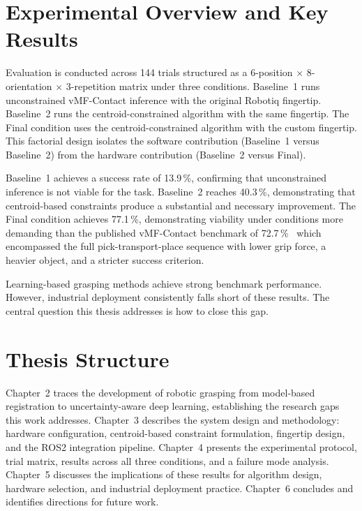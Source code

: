 \documentclass[12pt, a4paper]{report}
\begin{document}
\section{Experimental Overview and Key Results}
\label{sec:experimental-overview}

Evaluation is conducted across 144 trials structured as a 6-position $\times$ 8-orientation $\times$ 3-repetition matrix under three conditions. Baseline~1 runs unconstrained vMF-Contact inference with the original Robotiq fingertip. Baseline~2 runs the centroid-constrained algorithm with the same fingertip. The Final condition uses the centroid-constrained algorithm with the custom fingertip. This factorial design isolates the software contribution (Baseline~1 versus Baseline~2) from the hardware contribution (Baseline~2 versus Final).

Baseline~1 achieves a success rate of 13.9\,\%, confirming that unconstrained inference is not viable for the task. Baseline~2 reaches 40.3\,\%, demonstrating that centroid-based constraints produce a substantial and necessary improvement. The Final condition achieves 77.1\,\%, demonstrating viability under conditions more demanding than the published vMF-Contact benchmark of 72.7\,\%~\cite{shi2025} which encompassed the full pick-transport-place sequence with lower grip force, a heavier object, and a stricter success criterion. 

Learning-based grasping methods achieve strong benchmark performance. However, industrial deployment consistently falls short of these results. The central question this thesis addresses is how to close this gap.

\section{Thesis Structure}
\label{thesis-structure}

Chapter~2 traces the development of robotic grasping from model-based registration to uncertainty-aware deep learning, establishing the research gaps this work addresses. Chapter~3 describes the system design and methodology: hardware configuration, centroid-based constraint formulation, fingertip design, and the ROS2 integration pipeline. Chapter~4 presents the experimental protocol, trial matrix, results across all three conditions, and a failure mode analysis. Chapter~5 discusses the implications of these results for algorithm design, hardware selection, and industrial deployment practice. Chapter~6 concludes and identifies directions for future work.
\end{document}
